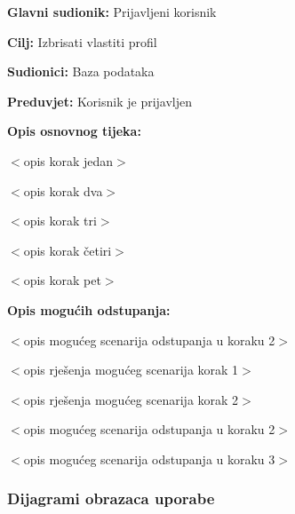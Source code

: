 \noindent {}
\begin{packed_item}

\item \textbf{Glavni sudionik:} Prijavljeni korisnik
\item  \textbf{Cilj:} Izbrisati vlastiti profil
\item  \textbf{Sudionici:} Baza podataka
\item  \textbf{Preduvjet:} Korisnik je prijavljen
\item  \textbf{Opis osnovnog tijeka:}

\item[] \begin{packed_enum}

    \item $<$opis korak jedan$>$
    \item $<$opis korak dva$>$
    \item $<$opis korak tri$>$
    \item $<$opis korak četiri$>$
    \item $<$opis korak pet$>$

\end{packed_enum}

\item  \textbf{Opis mogućih odstupanja:}

\item[] \begin{packed_item}

    \item[2.a] $<$opis mogućeg scenarija odstupanja u koraku 2$>$
    \item[] \begin{packed_enum}

        \item $<$opis rješenja mogućeg scenarija korak 1$>$
        \item $<$opis rješenja mogućeg scenarija korak 2$>$

    \end{packed_enum}

\item[2.b] $<$opis mogućeg scenarija odstupanja u koraku 2$>$
\item[3.a] $<$opis mogućeg scenarija odstupanja  u koraku 3$>$

\end{packed_item}
\end{packed_item}

\subsubsection{Dijagrami obrazaca uporabe}

